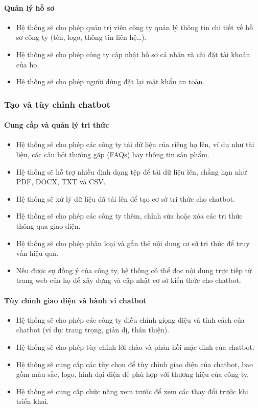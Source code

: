 \paragraph{Quản lý hồ sơ}
\begin{itemize}
    \item Hệ thống sẽ cho phép quản trị viên công ty quản lý thông tin chi tiết về hồ sơ công ty (tên, logo, thông tin liên hệ…).
    \item Hệ thống sẽ cho phép công ty cập nhật hồ sơ cá nhân và cài đặt tài khoản của họ.
    \item Hệ thống sẽ cho phép người dùng đặt lại mật khẩu an toàn.
\end{itemize}

\subsubsection{Tạo và tùy chỉnh chatbot}

\paragraph{Cung cấp và quản lý tri thức}
\begin{itemize}
    \item Hệ thống sẽ cho phép các công ty tải dữ liệu của riêng họ lên, ví dụ như tài liệu, các câu hỏi thường gặp (FAQs) hay thông tin sản phẩm.
    \item Hệ thống sẽ hỗ trợ nhiều định dạng tệp để tải dữ liệu lên, chẳng hạn như PDF, DOCX, TXT và CSV.
    \item Hệ thống sẽ xử lý dữ liệu đã tải lên để tạo cơ sở tri thức cho chatbot.
    \item Hệ thống sẽ cho phép các công ty thêm, chỉnh sửa hoặc xóa các tri thức thông qua giao diện.
    \item Hệ thống sẽ cho phép phân loại và gắn thẻ nội dung cơ sở tri thức để truy vấn hiệu quả.
    \item Nếu được sự đồng ý của công ty, hệ thống có thể đọc nội dung trực tiếp từ trang web của họ để xây dựng và cập nhật cơ sở kiến thức cho chatbot.
\end{itemize}

\paragraph{Tùy chỉnh giao diện và hành vi chatbot}
\begin{itemize}
    \item Hệ thống sẽ cho phép các công ty điều chỉnh giọng điệu và tính cách của chatbot (ví dụ: trang trọng, giản dị, thân thiện).
    \item Hệ thống sẽ cho phép tùy chỉnh lời chào và phản hồi mặc định của chatbot.
    \item Hệ thống sẽ cung cấp các tùy chọn để tùy chỉnh giao diện của chatbot, bao gồm màu sắc, logo, hình đại diện để phù hợp với thương hiệu của công ty.
    \item Hệ thống sẽ cung cấp chức năng xem trước để xem các thay đổi trước khi triển khai.
\end{itemize}

